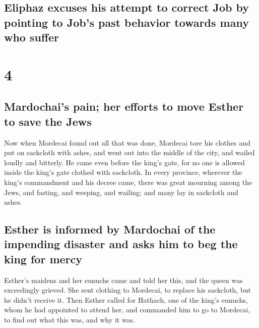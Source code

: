 \hypertarget{eliphaz-excuses-his-attempt-to-correct-job-by-pointing-to-jobs-past-behavior-towards-many-who-suffer}{%
\subsection{Eliphaz excuses his attempt to correct Job by pointing to
Job's past behavior towards many who
suffer}\label{eliphaz-excuses-his-attempt-to-correct-job-by-pointing-to-jobs-past-behavior-towards-many-who-suffer}}

\hypertarget{section-3}{%
\section{4}\label{section-3}}

\hypertarget{mardochais-pain-her-efforts-to-move-esther-to-save-the-jews}{%
\subsection{Mardochai's pain; her efforts to move Esther to save the
Jews}\label{mardochais-pain-her-efforts-to-move-esther-to-save-the-jews}}

 Now when Mordecai found out all that was done, Mordecai
tore his clothes and put on sackcloth with ashes, and went out into the
middle of the city, and wailed loudly and bitterly.  He
came even before the king's gate, for no one is allowed inside the
king's gate clothed with sackcloth.  In every province,
wherever the king's commandment and his decree came, there was great
mourning among the Jews, and fasting, and weeping, and wailing; and many
lay in sackcloth and ashes.

\hypertarget{esther-is-informed-by-mardochai-of-the-impending-disaster-and-asks-him-to-beg-the-king-for-mercy}{%
\subsection{Esther is informed by Mardochai of the impending disaster
and asks him to beg the king for
mercy}\label{esther-is-informed-by-mardochai-of-the-impending-disaster-and-asks-him-to-beg-the-king-for-mercy}}

 Esther's maidens and her eunuchs came and told her this,
and the queen was exceedingly grieved. She sent clothing to Mordecai, to
replace his sackcloth, but he didn't receive it.  Then
Esther called for Hathach, one of the king's eunuchs, whom he had
appointed to attend her, and commanded him to go to Mordecai, to find
out what this was, and why it was.

